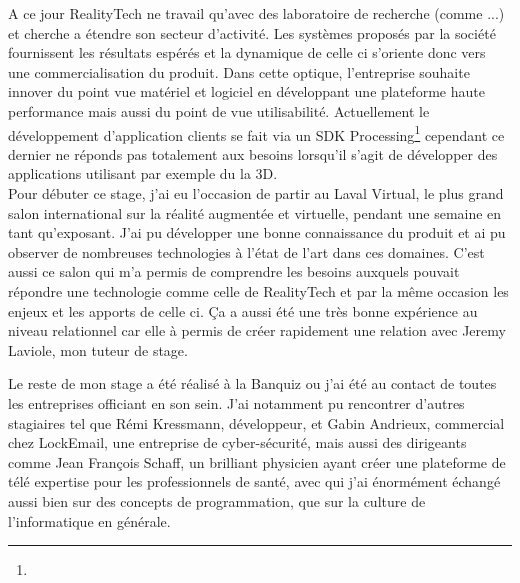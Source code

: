 A ce jour RealityTech ne travail qu'avec des laboratoire de recherche (comme ...) et cherche a étendre son secteur d'activité. Les systèmes proposés par la société fournissent les résultats espérés et la dynamique de celle ci s'oriente donc vers une commercialisation du produit. Dans cette optique, l'entreprise souhaite innover du point vue matériel et logiciel en développant une plateforme haute performance mais aussi du point de vue utilisabilité. Actuellement le développement d'application clients se fait via un SDK Processing\footnote{} cependant ce dernier ne réponds pas totalement aux besoins lorsqu'il s'agit de développer des applications utilisant par exemple du la 3D.\\

Pour débuter ce stage, j'ai eu l'occasion de partir au Laval Virtual, le plus grand salon international sur la réalité augmentée et virtuelle, pendant une semaine en tant qu'exposant. J'ai pu développer une bonne connaissance du produit et ai pu observer de nombreuses technologies à l'état de l'art dans ces domaines. C'est aussi ce salon qui m'a permis de comprendre les besoins auxquels pouvait répondre une technologie comme celle de RealityTech et par la même occasion les enjeux et les apports de celle ci. Ça a aussi été une très bonne expérience au niveau relationnel car elle à permis de créer rapidement une relation avec Jeremy Laviole, mon tuteur de stage.

Le reste de mon stage a été réalisé à la Banquiz ou j'ai été au contact de toutes les entreprises officiant en son sein. J'ai notamment pu rencontrer d'autres stagiaires tel que Rémi Kressmann, développeur, et Gabin Andrieux, commercial chez LockEmail, une entreprise de cyber-sécurité, mais aussi des dirigeants comme Jean François Schaff, un brilliant physicien ayant créer une plateforme de télé expertise pour les professionnels de santé, avec qui j'ai énormément échangé aussi bien sur des concepts de programmation, que sur la culture de l'informatique en générale.


